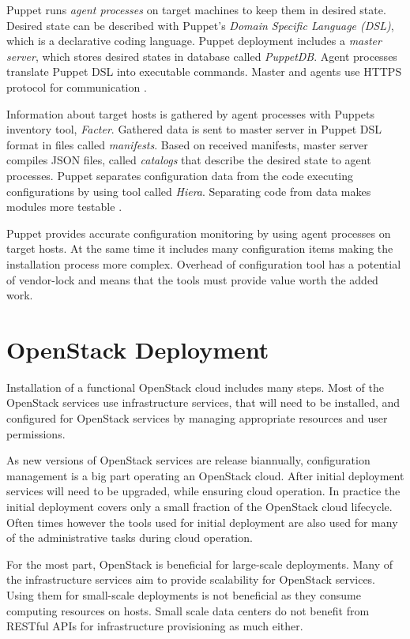 \documentclass[officiallayout]{tktla}
\begin{document}
Puppet runs \textit{agent processes} on target machines to keep them in desired
state. Desired state can be described with Puppet's \textit{Domain Specific
Language (DSL)}, which is a declarative coding language. Puppet deployment
includes a \textit{master server}, which stores desired states in database
called \textit{PuppetDB}. Agent processes translate Puppet DSL into executable
commands. Master and agents use HTTPS protocol for communication \cite{puppet}.

Information about target hosts is gathered by agent processes with Puppets
inventory tool, \textit{Facter}. Gathered data is sent to master server in
Puppet DSL format in files called \textit{manifests}. Based on received
manifests, master server compiles JSON files, called \textit{catalogs} that
describe the desired state to agent processes. Puppet separates configuration
data from the code executing configurations by using tool called
\textit{Hiera}. Separating code from data makes modules more testable
\cite{puppet}.

Puppet provides accurate configuration monitoring by using agent processes on
target hosts. At the same time it includes many configuration items making the
installation process more complex. Overhead of configuration tool has a
potential of vendor-lock and means that the tools must provide value worth the
added work.

\chapter{OpenStack Deployment}\label{deployment}

Installation of a functional OpenStack cloud includes many steps. Most of the
OpenStack services use infrastructure services, that will need to be installed,
and configured for OpenStack services by managing appropriate resources and
user permissions.

As new versions of OpenStack services are release biannually, configuration
management is a big part operating an OpenStack cloud. After initial deployment
services will need to be upgraded, while ensuring cloud operation. In practice
the initial deployment covers only a small fraction of the OpenStack cloud
lifecycle. Often times however the tools used for initial deployment are also
used for many of the administrative tasks during cloud operation.

For the most part, OpenStack is beneficial for large-scale deployments. Many of
the infrastructure services aim to provide scalability for OpenStack services.
Using them for small-scale deployments is not beneficial as they consume
computing resources on hosts. Small scale data centers do not benefit from
RESTful APIs for infrastructure provisioning as much either.
\end{document}
